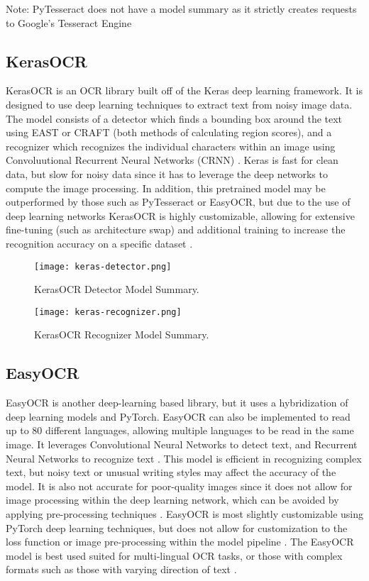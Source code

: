 \documentclass[9pt]{osa-supplemental-document}
\begin{document}
Note: PyTesseract does not have a model summary as it strictly creates requests to  Google's Tesseract Engine

\subsection{KerasOCR}
KerasOCR is an OCR library built off of the Keras deep learning framework.  It is designed to use deep learning techniques to extract text from noisy image data. The model consists of a detector which finds a bounding box around the text using EAST or CRAFT (both methods of calculating region scores), and a recognizer which recognizes the individual characters within an image using Convoluutional Recurrent Neural Networks (CRNN) \cite{kerasocr}. Keras is fast for clean data, but slow for noisy data since it has to leverage the deep networks to compute the image processing. In addition, this pretrained model may be outperformed by those such as PyTesseract or EasyOCR, but due to the use of deep learning networks KerasOCR is highly customizable, allowing for extensive fine-tuning (such as architecture swap) and additional training to increase the recognition accuracy on a specific dataset \cite{kerasocr}.

\begin{figure}[h]
  \centering
  \begin{minipage}[b]{0.55\textwidth}
    \texttt{[image: keras-detector.png]}
    \caption{KerasOCR Detector Model Summary.}
  \end{minipage}
  \hfill
  \begin{minipage}[b]{0.4\textwidth}
    \texttt{[image: keras-recognizer.png]}
    \caption{KerasOCR Recognizer Model Summary.}
  \end{minipage}
\end{figure}

\newpage

\subsection{EasyOCR}
EasyOCR is another deep-learning based library, but it uses a hybridization of deep learning models and PyTorch. EasyOCR can also be implemented to read up to 80 different languages, allowing multiple languages to be read in the same image. It leverages Convolutional Neural Networks to detect text, and Recurrent Neural Networks to recognize text \cite{easyocr}. This model is efficient in recognizing complex text, but noisy text or unusual writing styles may affect the accuracy of the model. It is also not accurate for poor-quality images since it does not allow for image processing within the deep learning network, which can be avoided by applying pre-processing techniques \cite{easyocr}. EasyOCR is most slightly customizable using PyTorch deep learning techniques, but does not allow for customization to the loss function or image pre-processing within the model pipeline \cite{easyocr}. The EasyOCR model is best used suited for multi-lingual OCR tasks, or those with complex formats such as those with varying direction of text \cite{easyocr}.
\end{document}
